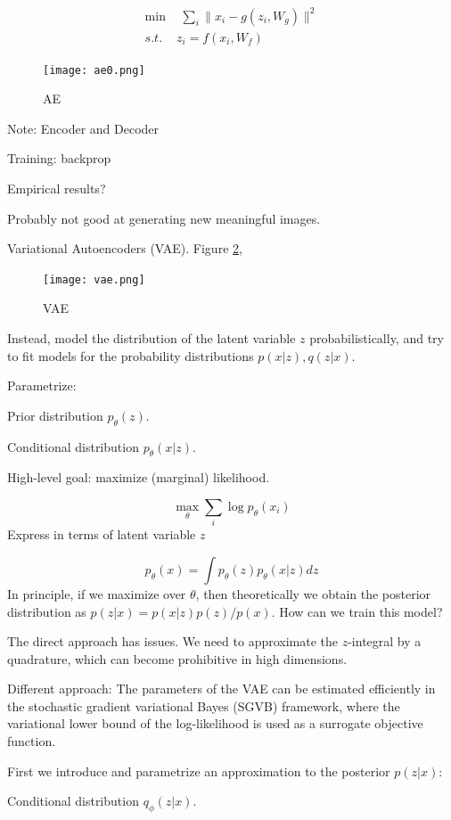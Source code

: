 \documentclass[english]{article}
\begin{document}
\begin{align*}
\min&\,\,\sum_i \|x_i-g(z_i,W_g)\|^2\\
s.t.\,\,&z_i = f(x_i,W_f)
\end{align*}

\begin{figure}
  \centering
  \texttt{[image: ae0.png]}
    \caption{AE}
    \label{ae0}
\end{figure}

Note: Encoder and Decoder

Training: backprop

Empirical results?

Probably not good at generating new meaningful images.

\item Variational Autoencoders  (VAE). Figure \ref{vae},

\begin{figure}
  \centering
  \texttt{[image: vae.png]}
    \caption{VAE}
    \label{vae}
\end{figure}

Instead, model the distribution of the latent variable $z$ probabilistically, and try to fit models for the probability distributions $p(x|z), q(z|x)$.

Parametrize:
\benum 
\item  Prior distribution $p_\theta(z)$.
\item  Conditional distribution $p_\theta(x|z)$.
\eenum 

High-level goal: maximize (marginal) likelihood. 

$$\max_\theta \sum_i \log p_\theta(x_i) 
$$
Express in terms of latent variable $z$

$$p_\theta(x) 
= \int 
p_\theta(z)p_\theta(x|z)dz
$$
In principle, if we maximize over $\theta$, then theoretically we obtain the posterior distribution as $p(z|x) = p(x|z)p(z)/p(x)$. How can we train this model?

The direct approach has issues. We need to approximate the $z$-integral by a quadrature, which can become prohibitive in high dimensions.

\item Different approach:
The parameters of the VAE can be estimated efficiently in the stochastic gradient variational Bayes (SGVB) framework, where the variational lower bound of the log-likelihood is used as a surrogate objective function. 

First we introduce and parametrize an approximation to the posterior $p(z|x)$:
\benum 
\item  Conditional distribution $q_\phi(z|x)$.
\eenum 
\end{document}

